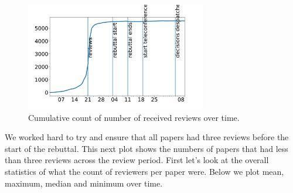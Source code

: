 \begin{figure}[htb]
\includegraphics[width=0.70\textwidth]{diagrams/neurips/review-count.pdf}


\caption{Cumulative count of number of received reviews over time.}
\label{review-count}
\end{figure}

We worked hard to try and ensure that all papers had three reviews
before the start of the rebuttal. This next plot shows the numbers of
papers that had less than three reviews across the review period. First
let's look at the overall statistics of what the count of reviewers per
paper were. Below we plot mean, maximum, median and minimum over time.

\begin{Shaded}
\begin{Highlighting}[]
\OperatorTok{=}\OperatorTok{=}\NormalTok{)}
\OperatorTok{=}\NormalTok{ lastseen[}\NormalTok{]}

\OperatorTok{=}\OperatorTok{=}\OperatorTok{=}
\OperatorTok{=}\OperatorTok{=}\OperatorTok{=}\NormalTok{)}
\OperatorTok{=}\NormalTok{)}
\OperatorTok{=}\NormalTok{)    }
\OperatorTok{=}
\NormalTok{        review\_count[col][review\_count.index}\OperatorTok{\textgreater{}}\NormalTok{lastseen[col]] }\OperatorTok{=}
        
\OperatorTok{=}
\end{Highlighting}
\end{Shaded}

